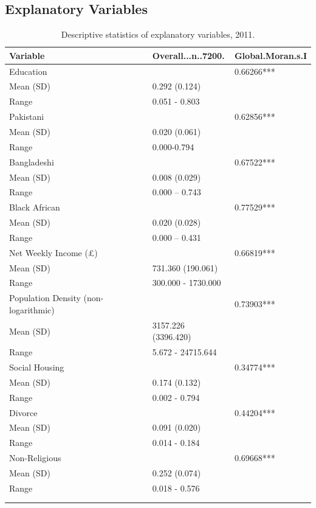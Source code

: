 \documentclass[12pt,twoside]{reedthesis}
\begin{document}
\hypertarget{explanatory-variables}{%
\subsection{Explanatory Variables}\label{explanatory-variables}}
\begin{table}

\caption{\label{tab:table2}Descriptive statistics of explanatory variables, 2011.}
\centering
\begin{tabu} to 
\toprule
Variable & Overall...n..7200. & Global.Moran.s.I\\
\midrule
Education &  & 0.66266***\\
Mean (SD) & 0.292 (0.124) & \\
Range & 0.051 - 0.803 & \\
Pakistani &  & 0.62856***\\
Mean (SD) & 0.020 (0.061) & \\
\addlinespace
Range & 0.000-0.794 & \\
Bangladeshi &  & 0.67522***\\
Mean (SD) & 0.008 (0.029) & \\
Range & 0.000 – 0.743 & \\
Black African &  & 0.77529***\\
\addlinespace
Mean (SD) & 0.020 (0.028) & \\
Range & 0.000 – 0.431 & \\
Net Weekly Income (£) &  & 0.66819***\\
Mean (SD) & 731.360 (190.061) & \\
Range & 300.000 - 1730.000 & \\
\addlinespace
Population Density (non-logarithmic) &  & 0.73903***\\
Mean (SD) & 3157.226 (3396.420) & \\
Range & 5.672 - 24715.644 & \\
Social Housing &  & 0.34774***\\
Mean (SD) & 0.174 (0.132) & \\
\addlinespace
Range & 0.002 - 0.794 & \\
Divorce &  & 0.44204***\\
Mean (SD) & 0.091 (0.020) & \\
Range & 0.014 - 0.184 & \\
Non-Religious &  & 0.69668***\\
\addlinespace
Mean (SD) & 0.252 (0.074) & \\
Range & 0.018 - 0.576 & \\
\bottomrule
{}\\
\\
\end{tabu}
\end{table}
\end{document}
